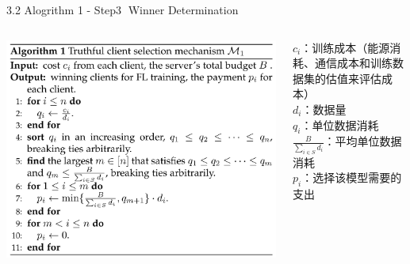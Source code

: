\documentclass{sintefbeamer}
\theoremstyle{definition}
\begin{document}
\begin{frame}{3.2 Alogrithm 1 - Step\textcircled{3} Winner Determination}{\empty}
\begin{columns}
\begin{column}{0.6\textwidth}
\vspace{0.5em}
\includegraphics[width=1\textwidth]{images/algo1}
\end{column}
\begin{column}{0.4\textwidth}
$c_i$：训练成本（能源消耗、通信成本和训练数据集的估值来评估成本）\\
$d_i$：数据量\\
$q_i$：单位数据消耗\\
$\frac{B}{\sum_{i \in S} d_i}$：平均单位数据消耗\\
$p_i$：选择该模型需要的支出
\end{column}
\end{columns}
\end{frame}
\end{document}
